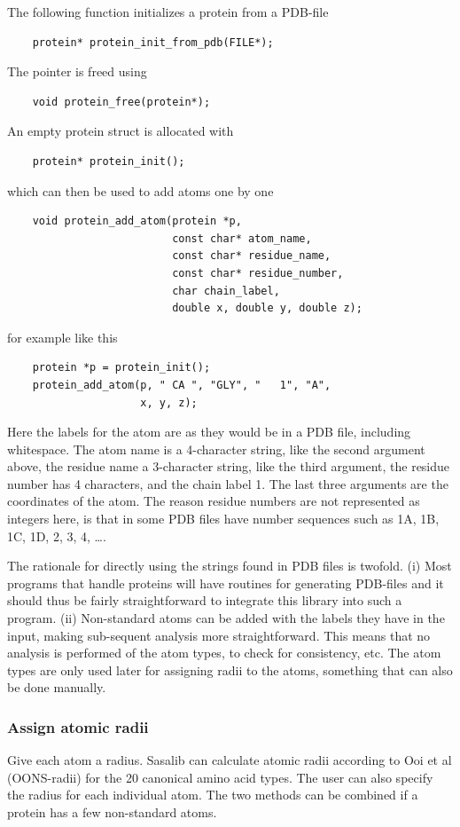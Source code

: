 \documentclass[a4paper,11pt]{article}
\begin{document}
The following function initializes a protein from a PDB-file
\begin{verbatim}
    protein* protein_init_from_pdb(FILE*); 
\end{verbatim}
The pointer is freed using
\begin{verbatim}
    void protein_free(protein*);
\end{verbatim}
An empty protein struct is allocated with 
\begin{verbatim}
    protein* protein_init();
\end{verbatim}
which can then be used to add atoms one by one
\begin{verbatim}
    void protein_add_atom(protein *p, 
                          const char* atom_name,
                          const char* residue_name, 
                          const char* residue_number,
                          char chain_label,
                          double x, double y, double z);

\end{verbatim}
for example like this
\begin{verbatim}
    protein *p = protein_init();
    protein_add_atom(p, " CA ", "GLY", "   1", "A",
                     x, y, z);
\end{verbatim}
Here the labels for the atom are as they would be in a PDB file,
including whitespace. The atom name is a 4-character string, like the
second argument above, the residue name a 3-character string, like the
third argument, the residue number has 4 characters, and the chain
label 1. The last three arguments are the coordinates of the atom. The
reason residue numbers are not represented as integers here, is that
in some PDB files have number sequences such as 1A, 1B, 1C, 1D, 2, 3,
4, \ldots.

The rationale for directly using the strings found in PDB files is
twofold. (i) Most programs that handle proteins will have routines for
generating PDB-files and it should thus be fairly straightforward to
integrate this library into such a program. (ii) Non-standard atoms
can be added with the labels they have in the input, making
sub-sequent analysis more straightforward. This means that no analysis
is performed of the atom types, to check for consistency, etc. The
atom types are only used later for assigning radii to the atoms,
something that can also be done manually.

\subsubsection{Assign atomic radii}
Give each atom a radius. Sasalib can calculate atomic radii according
to Ooi et al (OONS-radii) for the 20 canonical amino acid types. The
user can also specify the radius for each individual atom. The two
methods can be combined if a protein has a few non-standard atoms.
\end{document}
